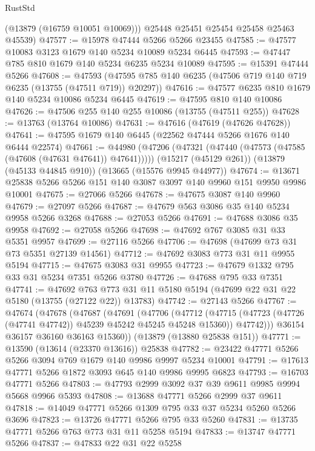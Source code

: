 \begin{lexlean}{RustStd}
\begin{coremodule}
        (@13879 (@16759 @10051 @10069)))
      @25448
      @25451
      @25454
      @25458
      @25463
      @45539)
@47577 := @15978 @47444 @5266 @5266 @23455
@47585 := @47577 @10083 @3123 @1679 @140 @5234 @10089 @5234 @6445
@47593 := @47447 @785 @810 @1679 @140 @5234 @6235 @5234 @10089
@47595 := @15391 @47444 @5266
@47608 := @47593
    (@47595 @785 @140 @6235 (@47506 @719 @140 @719 @6235 (@13755 (@47511 @719)) @20297))
@47616 := @47577 @6235 @810 @1679 @140 @5234 @10086 @5234 @6445
@47619 := @47595 @810 @140 @10086
@47626 := @47506 @255 @140 @255 @10086 (@13755 (@47511 @255))
@47628 := @13763 (@13764 @10086)
@47631 := @47616 (@47619 (@47626 @47628))
@47641 := @47595 @1679 @140 @6445 (@22562 @47444 @5266 @1676 @140 @6444 @22574)
@47661 := @44980
    (@47206 (@47321 (@47440 (@47573 (@47585 (@47608 (@47631 @47641)) @47641)))))
    (@15217 (@45129 @261))
    (@13879 (@45133 @44845 @910))
    (@13665 (@15576 @9945 @44977))
@47674 := @13671 @25838 @5266 @5266 @151 @140 @3087 @3097 @140 @9960 @151 @9950 @9986 @10001
@47675 := @27066 @5266
@47678 := @47675 @3087 @140 @9960
@47679 := @27097 @5266
@47687 := @47679 @563 @3086 @35 @140 @5234 @9958 @5266 @3268
@47688 := @27053 @5266
@47691 := @47688 @3086 @35 @9958
@47692 := @27058 @5266
@47698 := @47692 @767 @3085 @31 @33 @5351 @9957
@47699 := @27116 @5266
@47706 := @47698 (@47699 @73 @31 @73 @5351 @27139 @14561)
@47712 := @47692 @3083 @773 @31 @11 @9955 @5194
@47715 := @47675 @3083 @31 @9955
@47723 := @47679 @1332 @795 @33 @31 @5234 @7351 @5266 @3780
@47726 := @47688 @795 @33 @7351
@47741 := @47692
    @763
    @773
    @31
    @11
    @5180
    @5194
    (@47699 @22 @31 @22 @5180 (@13755 (@27122 @22)) @13783)
@47742 := @27143 @5266
@47767 := @47674
    (@47678
      (@47687
        (@47691
          (@47706
            (@47712
              (@47715 (@47723 (@47726 (@47741 @47742)) @45239 @45242 @45245 @45248 @15360))
              @47742)))
        @36154
        @36157
        @36160
        @36163
        @15360))
    (@13879 (@13880 @25838 @151))
@47771 := @13590 (@13614 (@23370 @13616)) @25838
@47782 := @23422 @47771 @5266 @5266 @3094 @769 @1679 @140 @9986 @9997 @5234 @10001
@47791 := @17613 @47771 @5266 @1872 @3093 @645 @140 @9986 @9995 @6823
@47793 := @16703 @47771 @5266
@47803 := @47793 @2999 @3092 @37 @39 @9611 @9985 @9994 @5668 @9966 @5393
@47808 := @13688 @47771 @5266 @2999 @37 @9611
@47818 := @14049 @47771 @5266 @1309 @795 @33 @37 @5234 @5260 @5266 @3696
@47823 := @13726 @47771 @5266 @795 @33 @5260
@47831 := @13735 @47771 @5266 @763 @773 @31 @11 @5258 @5194
@47833 := @13747 @47771 @5266
@47837 := @47833 @22 @31 @22 @5258

\end{coremodule}
\end{lexlean}

